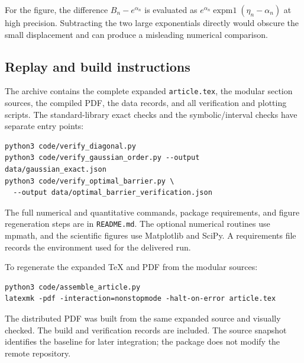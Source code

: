For the figure, the difference $B_n-e^{\alpha_n}$ is evaluated as
$e^{\alpha_n}\operatorname{expm1}(\eta_n-\alpha_n)$ at high precision.
Subtracting the two large exponentials directly would obscure the
small displacement and can produce a misleading numerical comparison.

\subsection{Replay and build instructions}

The archive contains the complete expanded \nolinkurl{article.tex},
the modular section sources, the compiled PDF, the data records,
and all verification and plotting scripts.
The standard-library exact checks and the symbolic/interval checks
have separate entry points:
\begin{minipage}{\textwidth}
\begin{verbatim}
python3 code/verify_diagonal.py
python3 code/verify_gaussian_order.py --output data/gaussian_exact.json
python3 code/verify_optimal_barrier.py \
  --output data/optimal_barrier_verification.json
\end{verbatim}
\end{minipage}
The full numerical and quantitative commands, package requirements,
and figure regeneration steps are in \nolinkurl{README.md}.
The optional numerical routines use mpmath, and the scientific figures
use Matplotlib and SciPy. A requirements file records the environment
used for the delivered run.

To regenerate the expanded TeX and PDF from the modular sources:
\begin{verbatim}
python3 code/assemble_article.py
latexmk -pdf -interaction=nonstopmode -halt-on-error article.tex
\end{verbatim}
The distributed PDF was built from the same expanded source and
visually checked. The build and verification records are included.
The source snapshot identifies the baseline for later integration;
the package does not modify the remote repository.
